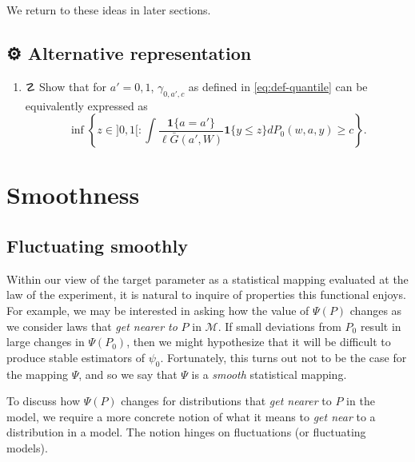 \documentclass[11pt,openright,twoside]{book}
\providecommand{\tightlist}{%
  \setlength{\itemsep}{0pt}\setlength{\parskip}{0pt}}
\newcommand{\gear}{\usebox{\gearbox}\;}
\DeclareRobustCommand{\stixdanger}{%
  {\usefont{U}{stixbbit}{m}{it}\symbol{"F6}}%
}
\newcommand{\calM}{\mathcal{M}}
\newcommand{\Gbar}{\bar{G}}
\newcommand{\one}{\textbf{1}}
\theoremstyle{definition}
\theoremstyle{definition}
\theoremstyle{definition}
\theoremstyle{remark}
\begin{document}
We return to these ideas in later sections.

\hypertarget{exo-alternative-parameter-third-pass}{%
\section{\texorpdfstring{⚙ \gear Alternative representation}{⚙ Alternative representation}}\label{exo-alternative-parameter-third-pass}}

\begin{enumerate}
\def\labelenumi{\arabic{enumi}.}
\tightlist
\item
  ☡ \stixdanger{} Show that for \(a' = 0,1\), \(\gamma_{0,a',c}\) as defined in
  \eqref{eq:def-quantile} can be equivalently expressed as \begin{equation*}\inf
  \left\{z \in ]0,1[  : \int \frac{\one\{a =  a'\}}{\ell\Gbar(a',W)} \one\{y \le
  z\} dP_0(w,a,y) \ge c \right\}.\end{equation*}
\end{enumerate}

\hypertarget{smooth}{%
\chapter{Smoothness}\label{smooth}}

\hypertarget{smooth-first-pass}{%
\section{Fluctuating smoothly}\label{smooth-first-pass}}

Within our view of the target parameter as a statistical mapping evaluated at
the law of the experiment, it is natural to inquire of properties this
functional enjoys. For example, we may be interested in asking how the value
of \(\Psi(P)\) changes as we consider laws that \emph{get nearer to} \(P\) in \(\calM\).
If small deviations from \(P_0\) result in large changes in \(\Psi(P_0)\), then we
might hypothesize that it will be difficult to produce stable estimators of
\(\psi_0\). Fortunately, this turns out not to be the case for the mapping
\(\Psi\), and so we say that \(\Psi\) is a \emph{smooth} statistical mapping.

To discuss how \(\Psi(P)\) changes for distributions that \emph{get nearer} to \(P\) in
the model, we require a more concrete notion of what it means to \emph{get near} to
a distribution in a model. The notion
hinges on fluctuations (or fluctuating models).
\end{document}
